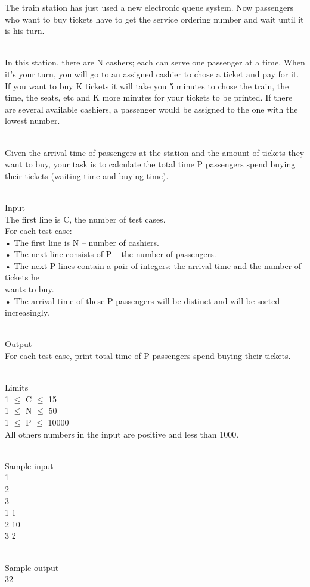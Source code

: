 



   The train station has just used a new electronic queue system. Now passengers who want to buy tickets have to get the service ordering number and wait until it is his turn.  


\\   In this station, there are N cashers; each can serve one passenger at a time. When it’s your turn, you will go to an assigned cashier to chose a ticket and pay for it. If you want to buy K tickets it will take you 5 minutes to chose the train, the time, the seats, etc and K more minutes for your tickets to be printed. If there are several available cashiers, a passenger would be assigned to the one with the lowest number.  


\\   Given the arrival time of passengers at the station and the amount of tickets they want to buy, your task is to calculate the total time P passengers spend buying their tickets (waiting time and buying time).  


\\   Input   
\\   The first line is C, the number of test cases.   
\\   For each test case:   
\\   • The first line is N – number of cashiers.   
\\   • The next line consists of P – the number of passengers.   
\\   • The next P lines contain a pair of integers: the arrival time and the number of tickets he   
\\   wants to buy.   
\\   • The arrival time of these P passengers will be distinct and will be sorted increasingly.  


\\   Output   
\\   For each test case, print total time of P passengers spend buying their tickets.  


\\   Limits   
\\   1  $\le$  C  $\le$  15   
\\   1  $\le$  N  $\le$  50   
\\   1  $\le$  P  $\le$  10000   
\\   All others numbers in the input are positive and less than 1000.  


\\   Sample input   
\\   1   
\\   2   
\\   3   
\\   1 1   
\\   2 10   
\\   3 2  


\\   Sample output   
\\   32  
